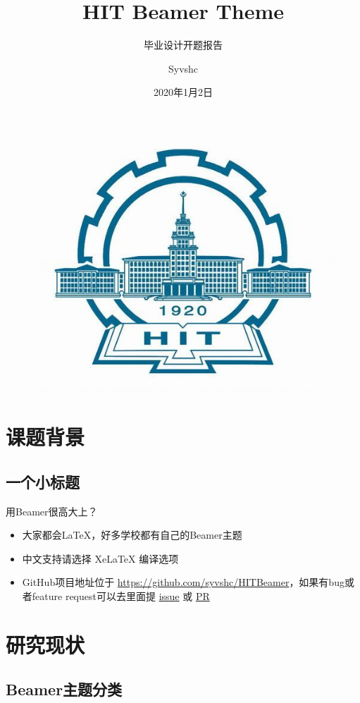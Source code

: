 \documentclass{beamer}
\author{Syvshc}
\title{HIT Beamer Theme}
\subtitle{毕业设计开题报告}
\institute[信息与计算科学]{哈尔滨工业大学数学学院信息与计算科学}
\date{2020年1月2日}
\begin{document}
\begin{frame}
    \titlepage
    \begin{figure}[htpb]
        \begin{center}
            \includegraphics[width=0.2\linewidth]{pic/hitcolor.jpg}
        \end{center}
    \end{figure}
\end{frame}

\begin{frame}
    \tableofcontents[sectionstyle=show,subsectionstyle=show/shaded/hide,subsubsectionstyle=show/shaded/hide]
\end{frame}


\section{课题背景}
\subsection{一个小标题}
\begin{frame}{用Beamer很高大上？}
    \begin{itemize}[<+->] %
        \item 大家都会\LaTeX{}，好多学校都有自己的Beamer主题
        \item 中文支持请选择 Xe\LaTeX{} 编译选项
        \item GitHub项目地址位于 \url{https://github.com/syvshc/HITBeamer}，如果有bug或者feature request可以去里面提 \href{https://github.com/syvshc/HITBeamer/issues}{issue} 或 \href{https://github.com/syvshc/HITBeamer/pulls}{PR}
    \end{itemize}
\end{frame}


\section{研究现状}

\subsection{Beamer主题分类}
\end{document}
